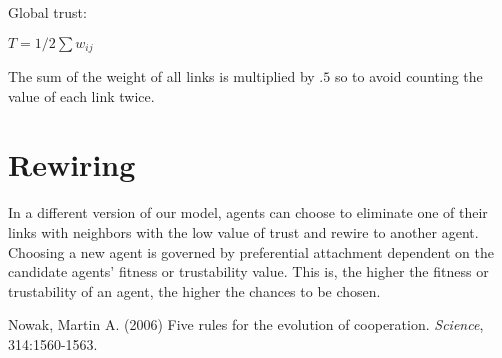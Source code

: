 \documentclass[11pt]{article} \usepackage{amsmath}
\begin{document}
Global trust:

$T = 1/2 \sum w_{ij}$

The sum of the weight of all links is multiplied by $.5$ so to avoid counting the value of each link twice.\\

\section{Rewiring}

In a different version of our model, agents can choose to eliminate
one of their links with neighbors with the low value of trust and
rewire to another agent. Choosing a new agent is governed by
preferential attachment dependent on the candidate agents' fitness or
trustability value. This is, the higher the fitness or trustability of
an agent, the higher the chances to be chosen.

\begin{thebibliography}{30}

 Nowak, Martin A. (2006) Five rules for the
  evolution of cooperation. \textit{Science}, 314:1560-1563.

\end{thebibliography}
\end{document}
